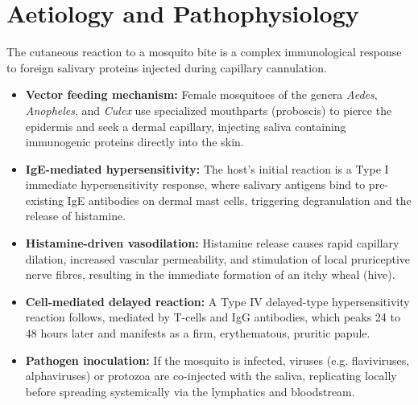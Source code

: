 \section*{Aetiology and Pathophysiology}
The cutaneous reaction to a mosquito bite is a complex immunological response to foreign salivary proteins injected during capillary cannulation.
\begin{itemize}
    \item \textbf{Vector feeding mechanism:} Female mosquitoes of the genera \textit{Aedes}, \textit{Anopheles}, and \textit{Culex} use specialized mouthparts (proboscis) to pierce the epidermis and seek a dermal capillary, injecting saliva containing immunogenic proteins directly into the skin.
    \item \textbf{IgE-mediated hypersensitivity:} The host's initial reaction is a Type I immediate hypersensitivity response, where salivary antigens bind to pre-existing IgE antibodies on dermal mast cells, triggering degranulation and the release of histamine.
    \item \textbf{Histamine-driven vasodilation:} Histamine release causes rapid capillary dilation, increased vascular permeability, and stimulation of local pruriceptive nerve fibres, resulting in the immediate formation of an itchy wheal (hive).
    \item \textbf{Cell-mediated delayed reaction:} A Type IV delayed-type hypersensitivity reaction follows, mediated by T-cells and IgG antibodies, which peaks 24 to 48 hours later and manifests as a firm, erythematous, pruritic papule.
    \item \textbf{Pathogen inoculation:} If the mosquito is infected, viruses (e.g. flaviviruses, alphaviruses) or protozoa are co-injected with the saliva, replicating locally before spreading systemically via the lymphatics and bloodstream.
\end{itemize}


